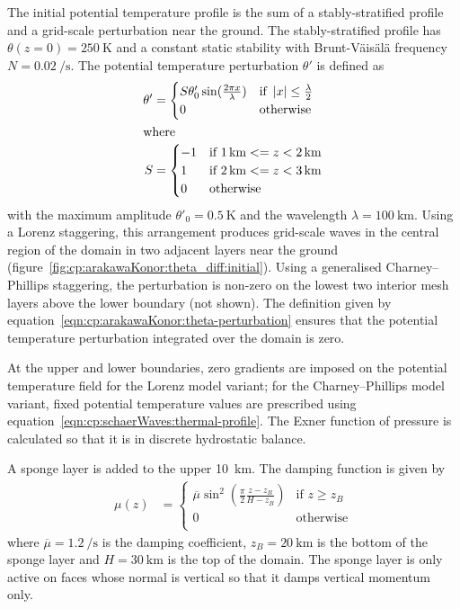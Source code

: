 The initial potential temperature profile is the sum of a stably-stratified profile and a grid-scale perturbation near the ground.
The stably-stratified profile has $\theta(z = 0) = \SI{250}{\kelvin}$ and a constant static stability with Brunt-V\"ais\"al\"a frequency $N = \SI{0.02}{\per\second}$.
The potential temperature perturbation $\theta'$ is defined as
\begin{subequations}
\label{eqn:cp:arakawaKonor:theta-perturbation}
\begin{align}
	\theta' &= \begin{cases} S \theta'_0 \sin(\frac{2 \pi x}{\lambda}) & \text{if } \left\lvert x \right\rvert \leq \frac{\lambda}{2} \\
		0 & \text{otherwise} \\
	\end{cases} \\
\shortintertext{where}
	S &= \begin{cases}
		-1 & \text{if } \SI{1}{\kilo\meter} <= z < \SI{2}{\kilo\meter} \\
		1 & \text{if } \SI{2}{\kilo\meter} <= z < \SI{3}{\kilo\meter} \\
		0 & \text{otherwise} \\
	\end{cases}
\end{align}
\end{subequations}
with the maximum amplitude $\theta'_0 = \SI{0.5}{\kelvin}$ and the wavelength $\lambda = \SI{100}{\kilo\meter}$.
Using a Lorenz staggering, this arrangement produces grid-scale waves in the central region of the domain in two adjacent layers near the ground (figure~\ref{fig:cp:arakawaKonor:theta_diff:initial}).
Using a generalised Charney--Phillips staggering, the perturbation is non-zero on the lowest two interior mesh layers above the lower boundary (not shown).
The definition given by equation~\eqref{eqn:cp:arakawaKonor:theta-perturbation} ensures that the potential temperature perturbation integrated over the domain is zero.

At the upper and lower boundaries, zero gradients are imposed on the potential temperature field for the Lorenz model variant; for the Charney--Phillips model variant, fixed potential temperature values are prescribed using equation~\ref{eqn:cp:schaerWaves:thermal-profile}.
The Exner function of pressure is calculated so that it is in discrete hydrostatic balance.

A sponge layer is added to the upper \SI{10}{\kilo\meter}.  The damping function is given by
\begin{align}
	\mu(z) &= \begin{cases}
		\overline{\mu} \sin^2 \left( \frac{\pi}{2} \frac{z - z_B}{H - z_B} \right) & \text{if } z \geq z_B \\
		0 & \text{otherwise} \\
	\end{cases}
\end{align}
where $\overline{\mu} = \SI{1.2}{\per\second}$ is the damping coefficient, $z_B = \SI{20}{\kilo\meter}$ is the bottom of the sponge layer and $H = \SI{30}{\kilo\meter}$ is the top of the domain.
The sponge layer is only active on faces whose normal is vertical so that it damps vertical momentum only.


